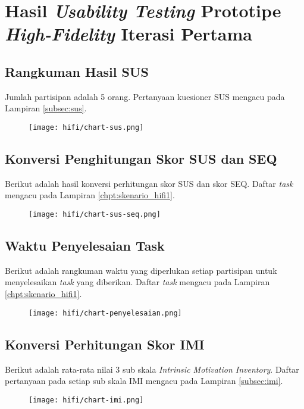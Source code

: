 \chapter{Hasil \textit{Usability Testing} Prototipe \textit{High-Fidelity} Iterasi Pertama}
\label{chpt:hasil_test_hifi1}

\large \section{Rangkuman Hasil SUS}
\normalsize

Jumlah partisipan adalah 5 orang.
Pertanyaan kuesioner SUS mengacu pada Lampiran \ref{subsec:sus}.

\begin{figure}[h]
  \centering
  \texttt{[image: hifi/chart-sus.png]}
\end{figure}


\large \section{Konversi Penghitungan Skor SUS dan SEQ}
\normalsize
Berikut adalah hasil konversi perhitungan skor SUS dan skor SEQ. Daftar \textit{task} mengacu pada Lampiran \ref{chpt:skenario_hifi1}.

\begin{figure}[h]
  \centering
  \texttt{[image: hifi/chart-sus-seq.png]}
\end{figure}

\large \section{Waktu Penyelesaian Task}
\normalsize

Berikut adalah rangkuman waktu yang diperlukan setiap partisipan untuk menyelesaikan \textit{task} yang diberikan. Daftar \textit{task} mengacu pada Lampiran \ref{chpt:skenario_hifi1}.

\begin{figure}[h]
  \centering
  \texttt{[image: hifi/chart-penyelesaian.png]}
\end{figure}

\large \section{Konversi Perhitungan Skor IMI}
\normalsize

Berikut adalah rata-rata nilai 3 sub skala \textit{Intrinsic Motivation Inventory}. Daftar pertanyaan pada setiap sub skala IMI mengacu pada Lampiran \ref{subsec:imi}.

\begin{figure}[h]
  \centering
  \texttt{[image: hifi/chart-imi.png]}
\end{figure}